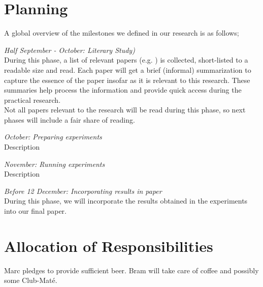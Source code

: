 \section{Planning}
A global overview of the milestones we defined in our research is as follows;
\begin{description}
  \item \emph{Half September - October: Literary Study)}\\
    During this phase, a list of relevant papers (e.g. \cite{levy2014linguistic, mikolov2013exploiting, wolf2014joint}) is collected, short-listed to a readable size and read. Each paper will get a brief (informal) summarization to capture the essence of the paper insofar as it is relevant to this research. These summaries help process the information and provide quick access during the practical research.\\

    Not all papers relevant to the research will be read during this phase, so next phases will include a fair share of reading.
  \item \emph{October: Preparing experiments}\\
    Description
  \item \emph{November: Running experiments}\\
    Description
  \item \emph{Before 12 December: Incorporating results in paper}\\
    During this phase, we will incorporate the results obtained in the experiments into our final paper.
\end{description}

\section{Allocation of Responsibilities}
Marc pledges to provide sufficient beer. Bram will take care of coffee and possibly some Club-Maté.

\lipsum[66]